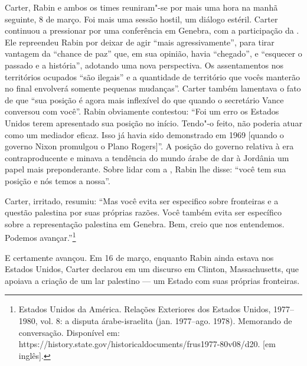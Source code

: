 Carter, Rabin e ambos os times reuniram"-se por mais uma hora na manhã
seguinte, 8 de março. Foi mais uma sessão hostil, um diálogo estéril.
Carter continuou a pressionar por uma conferência em Genebra, com a
participação da . Ele repreendeu Rabin por deixar de agir ``mais
agressivamente'', para tirar vantagem da ``chance de paz'' que, em sua
opinião, havia ``chegado'', e ``esquecer o passado e a história'',
adotando uma nova perspectiva. Os assentamentos nos territórios ocupados
``são ilegais'' e a quantidade de território que vocês manterão no final
envolverá somente pequenas mudanças''. Carter também lamentava o fato de
que ``sua posição é agora mais inflexível do que quando o secretário Vance
conversou com você''. Rabin obviamente contestou: ``Foi um erro os
Estados Unidos terem apresentado sua posição no início. Tendo"-o feito,
não poderia atuar como um mediador eficaz. Isso já havia sido
demonstrado em 1969 {[}quando o governo Nixon promulgou o Plano Rogers{]}''.
A posição do governo relativa à  era contraproducente e minava a
tendência do mundo árabe de dar à Jordânia um papel mais preponderante.
Sobre lidar com a , Rabin lhe disse: ``você tem sua posição e nós
temos a nossa''.

Carter, irritado, resumiu: ``Mas você evita ser especifico sobre
fronteiras e a questão palestina por suas próprias razões. Você também
evita ser específico sobre a representação palestina em Genebra. Bem,
creio que nos entendemos. Podemos avançar.''\footnote{Estados Unidos da América. Relações Exteriores dos Estados Unidos, 1977--1980, vol. 8: a disputa árabe-israelita (jan. 1977--ago. 1978). Memorando de conversação. Disponível em: https://history.state.gov/historicaldocuments/frus1977-80v08/d20. {[}em inglês{]}.}

E certamente avançou. Em 16 de março, enquanto Rabin ainda estava nos
Estados Unidos, Carter declarou em um discurso em Clinton,
Massachusetts, que apoiava a criação de um lar palestino --- um Estado
com suas próprias fronteiras.

